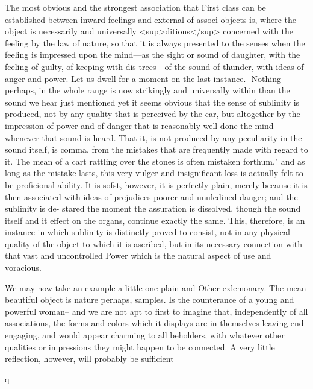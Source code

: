 The most obvious and the strongest association that First class can be established between inward feelings and external of associ-objects is, where the object is necessarily and universally <sup>ditions</sup> concerned with the feeling by the law of nature, so that it is always presented to the senses when the feeling is impressed upon the mind—as the sight or sound of daughter, with the feeling of guilty, of keeping with dis-trees—of the sound of thunder, with ideas of anger and power. Let us dwell for a moment on the last instance. -Nothing perhaps, in the whole range is now strikingly and universally within than the sound we hear just mentioned yet it seems obvious that the sense of sublinity is produced, not by any quality that is perceived by the car, but altogether by the impression of power and of danger that is reasonably well done the mind whenever that sound is heard. That it, is not produced by any peculiarity in the sound itself, is comma, from the mistakes that are frequently made with regard to it. The mean of a cart rattling over the stones is often mistaken forthum," and as long as the mistake lasts, this very vulger and insignificant loss is actually felt to be proficional ability. It is sofst, however, it is perfectly plain, merely because it is then associated with ideas of prejudices poorer and unuledined danger; and the sublinity is de- stared the moment the assuration is dissolved, though the sound itself and it effect on the organs, continue exactly the same. This, therefore, is an instance in which sublinity is distinctly proved to consist, not in any physical quality of the object to which it is ascribed, but in its necessary connection with that vast and uncontrolled Power which is the natural aspect of use and voracious.\par\medskip
We may now take an example a little one plain and Other exlemonary. The mean beautiful object is nature perhaps, samples. Is the counterance of a young and powerful woman-- and we are not apt to first to imagine that, independently of all associations, the forms and colors which it displays are in themselves leaving end engaging, and would appear charming to all beholders, with whatever other qualities or impressions they might happen to be connected. A very little reflection, however, will probably be sufficient\par{} q\par\medskip
